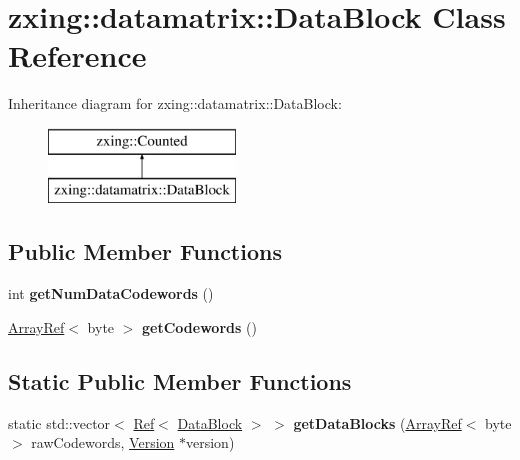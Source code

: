 \hypertarget{classzxing_1_1datamatrix_1_1_data_block}{}\section{zxing\+:\+:datamatrix\+:\+:Data\+Block Class Reference}
\label{classzxing_1_1datamatrix_1_1_data_block}
Inheritance diagram for zxing\+:\+:datamatrix\+:\+:Data\+Block\+:\begin{figure}[H]
\begin{center}
\leavevmode
\includegraphics[height=2.000000cm]{classzxing_1_1datamatrix_1_1_data_block}
\end{center}
\end{figure}
\subsection*{Public Member Functions}
\begin{DoxyCompactItemize}
\item 
\mbox{\label{classzxing_1_1datamatrix_1_1_data_block_ac146432f7d12db15d6dc4466b8f8ab3b}} 
int {\bfseries get\+Num\+Data\+Codewords} ()
\item 
\mbox{\label{classzxing_1_1datamatrix_1_1_data_block_a08b266633819a4d0f9776a4fdeb38bf2}} 
\mbox{\hyperlink{classzxing_1_1_array_ref}{Array\+Ref}}$<$ byte $>$ {\bfseries get\+Codewords} ()
\end{DoxyCompactItemize}
\subsection*{Static Public Member Functions}
\begin{DoxyCompactItemize}
\item 
\mbox{\label{classzxing_1_1datamatrix_1_1_data_block_a7f8318fd7b08ea8ad2e28f6c8c111e14}} 
static std\+::vector$<$ \mbox{\hyperlink{classzxing_1_1_ref}{Ref}}$<$ \mbox{\hyperlink{classzxing_1_1datamatrix_1_1_data_block}{Data\+Block}} $>$ $>$ {\bfseries get\+Data\+Blocks} (\mbox{\hyperlink{classzxing_1_1_array_ref}{Array\+Ref}}$<$ byte $>$ raw\+Codewords, \mbox{\hyperlink{classzxing_1_1datamatrix_1_1_version}{Version}} $\ast$version)
\end{DoxyCompactItemize}


